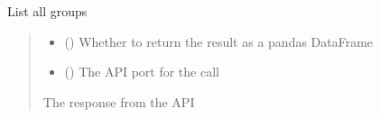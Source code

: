 \documentclass[letterpaper,10pt,english]{sphinxmanual}
\begin{document}
\begin{fulllineitems}
\begin{fulllineitems}
\label{\detokenize{aisquared.platform:aisquared.platform.AISquaredPlatformClient.AISquaredPlatformClient.list_groups}}
\pysigstartsignatures
{}
\pysigstopsignatures
\sphinxAtStartPar
List all groups

\begin{sphinxVerbatim}[commandchars=\\\{\}]
 
  
\end{sphinxVerbatim}
\begin{quote}\begin{description}
\begin{itemize}
\item {} 
\sphinxAtStartPar
{} (\sphinxstyleliteralemphasis{\sphinxupquote{ (}}\sphinxstyleliteralemphasis{\sphinxupquote{)}}) \textendash{} Whether to return the result as a pandas DataFrame

\item {} 
\sphinxAtStartPar
{} (\sphinxstyleliteralemphasis{\sphinxupquote{ (}}\sphinxstyleliteralemphasis{\sphinxupquote{)}}) \textendash{} The API port for the call

\end{itemize}

\sphinxAtStartPar
{} \textendash{} The response from the API


\end{description}
\end{quote}
\end{fulllineitems}
\end{fulllineitems}
\end{document}
